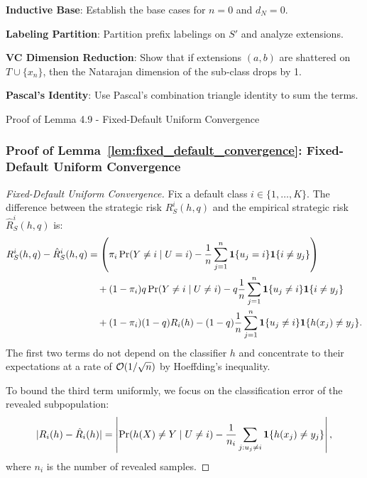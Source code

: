 \begin{guideblock}
\item \textbf{Inductive Base}: Establish the base cases for $n=0$ and $d_N=0$.
\item \textbf{Labeling Partition}: Partition prefix labelings on $S'$ and analyze extensions.
\item \textbf{VC Dimension Reduction}: Show that if extensions $(a,b)$ are shattered on $T \cup \{x_n\}$, then the Natarajan dimension of the sub-class drops by 1.
\item \textbf{Pascal's Identity}: Use Pascal's combination triangle identity to sum the terms.
\end{guideblock}


\begin{sourceblock}{Proof of Lemma 4.9 - Fixed-Default Uniform Convergence}
\subsubsection*{Proof of Lemma~\ref{lem:fixed_default_convergence}: Fixed-Default Uniform Convergence}
\label{app:proof_fixed_default_convergence}
\begin{proof}[Fixed-Default Uniform Convergence]
Fix a default class $i \in \{1, \dots, K\}$. The difference between the strategic risk $R^i_S(h, q)$ and the empirical strategic risk $\hat{R}^i_S(h, q)$ is:
\begin{align}
    R^i_S(h, q) - \hat{R}^i_S(h, q) &= \left( \pi_i \Pr(Y \ne i \mid U = i) - \frac{1}{n}\sum_{j=1}^n \mathbf{1}\{u_j = i\}\mathbf{1}\{i \ne y_j\} \right) \nonumber \\
    &\quad + (1 - \pi_i)q\Pr(Y \ne i \mid U \ne i) - q\frac{1}{n}\sum_{j=1}^n \mathbf{1}\{u_j \ne i\}\mathbf{1}\{i \ne y_j\} \nonumber \\
    &\quad + (1 - \pi_i)(1 - q)R_i(h) - (1 - q)\frac{1}{n}\sum_{j=1}^n \mathbf{1}\{u_j \ne i\}\mathbf{1}\{h(x_j) \ne y_j\}.
\end{align}
The first two terms do not depend on the classifier $h$ and concentrate to their expectations at a rate of $\mathcal{O}(1/\sqrt{n})$ by Hoeffding's inequality.

To bound the third term uniformly, we focus on the classification error of the revealed subpopulation:
\begin{equation}
    |R_i(h) - \hat{R}_i(h)| = \left| \Pr(h(X) \ne Y \mid U \ne i) - \frac{1}{n_i}\sum_{j : u_j \ne i} \mathbf{1}\{h(x_j) \ne y_j\} \right|,
\end{equation}
where $n_i$ is the number of revealed samples.


\end{proof}
\end{sourceblock}
